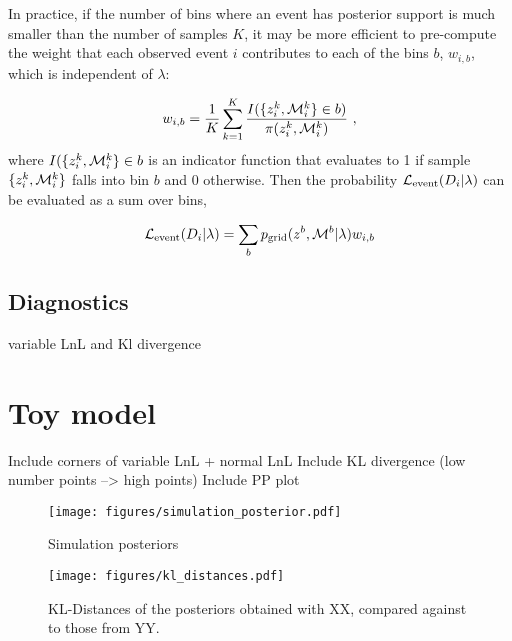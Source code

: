 \documentclass[twocolumn]{aastex631}
\begin{document}
In practice, if the number of bins where an event has posterior support is much smaller than the number of samples $K$, it may be more efficient to pre-compute the weight that each observed event $i$ contributes to each of the bins $b$, $w_{i,b}$, which is independent of $\lambda$:

\begin{equation}
    w_{i,b} = \frac{1}{K} \sum^K_{k=1} \frac{I(\{z^k_i,\Mc^k_i\} \in b)}{\pi(z_i^k,\Mc_i^k)} \ ,
\end{equation}
where $I(\{z^k_i,\mathcal{M}^k_i\} \in b$ is an indicator function that evaluates to 1 if sample $\{z^k_i,\mathcal{M}^k_i\}$ falls into bin $b$ and $0$ otherwise.
Then the probability $\mathcal{L}_{\rm event}(D_i|\lambda)$ can be evaluated as a sum over bins,

\begin{equation}
    \Le(D_i|\lambda) = \sum_b \pg(z^b, \Mc^b | \lambda) w_{i,b}
\end{equation}


\subsection{Diagnostics}
variable LnL and Kl divergence

\section{Toy model}
Include corners of variable LnL + normal LnL
Include KL divergence (low number points --> high points)
Include PP plot

\begin{figure}[ht!]
    \begin{centering}
        \texttt{[image: figures/simulation\_posterior.pdf]}
        \caption{
            Simulation posteriors
        }
        \label{fig:simulation_posterior}
    \end{centering}
\end{figure}




\begin{figure}[ht!]
    \begin{centering}
        \texttt{[image: figures/kl\_distances.pdf]}
        \caption{
            KL-Distances of the posteriors obtained with XX, compared against to those from YY.
        }
        \label{fig:kl_distances}
    \end{centering}
\end{figure}
\end{document}
